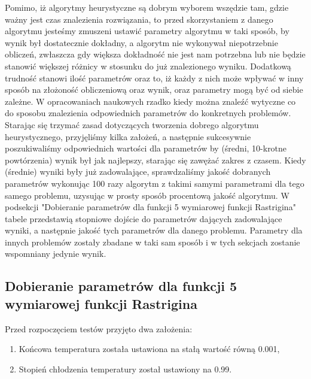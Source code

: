 \documentclass[twoside]{projektInzynierskiMS1}
\newcommand{\si}{ś}
\begin{document}
Pomimo, iż algorytmy heurystyczne są dobrym wyborem wszędzie tam, gdzie ważny jest czas znalezienia rozwiązania, to przed skorzystaniem z danego algorytmu jeste\si my zmuszeni ustawić parametry algorytmu w taki sposób, by wynik był dostatecznie dokładny, a algorytm nie wykonywał niepotrzebnie obliczeń, zwłaszcza gdy większa dokładno\si ć nie jest nam potrzebna lub nie będzie stanowić większej różnicy w stosunku do już znalezionego wyniku. Dodatkową trudno\si ć stanowi ilo\si ć parametrów oraz to, iż każdy z nich może wpływać w inny sposób na złożono\si ć obliczeniową oraz wynik, oraz parametry mogą być od siebie zależne. W opracowaniach naukowych rzadko kiedy można znaleźć wytyczne co do sposobu znalezienia odpowiednich parametrów do konkretnych problemów. \\

Starając się trzymać zasad dotyczących tworzenia dobrego algorytmu heurystycznego, przyjęli\si my kilka założeń, a następnie sukcesywnie poszukiwali\si my odpowiednich warto\si ci dla parametrów by (\si redni, 10-krotne powtórzenia) wynik był jak najlepszy, starając się zawężać zakres z czasem. Kiedy (\si rednie) wyniki były już zadowalające, sprawdzali\si my jako\si ć dobranych parametrów wykonując 100 razy algorytm z takimi samymi parametrami dla tego samego problemu, uzysując w prosty sposób procentową jako\si ć algorytmu. W podsekcji "Dobieranie parametrów dla funkcji 5 wymiarowej funkcji Rastrigina" tabele przedstawią stopniowe doj\si cie do parametrów dających zadowalające wyniki, a następnie jako\si ć tych parametrów dla danego problemu. Parametry dla innych problemów zostały zbadane w taki sam sposób i w tych sekcjach zostanie wspomniany jedynie wynik.

	\subsection{Dobieranie parametrów dla funkcji 5 wymiarowej funkcji Rastrigina}

Przed rozpoczęciem testów przyjęto dwa założenia:
\begin{enumerate}
	\item Końcowa temperatura została ustawiona na stałą warto\si ć równą 0.001,
	\item Stopień chłodzenia temperatury został ustawiony na 0.99.
\end{enumerate}

\renewcommand\arraystretch{1.333}
\end{document}
